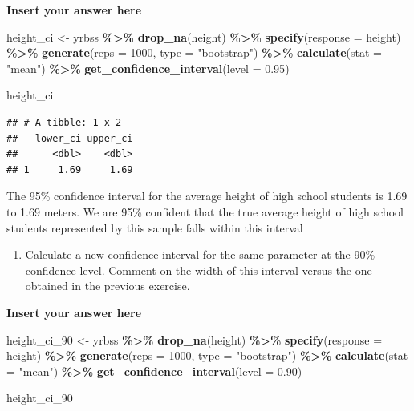 \documentclass[
]{article}
\newenvironment{Shaded}{\begin{snugshade}}{\end{snugshade}}
\newcommand{\AttributeTok}[1]{\textcolor[rgb]{0.13,0.29,0.53}{#1}}
\newcommand{\DecValTok}[1]{\textcolor[rgb]{0.00,0.00,0.81}{#1}}
\newcommand{\FloatTok}[1]{\textcolor[rgb]{0.00,0.00,0.81}{#1}}
\newcommand{\FunctionTok}[1]{\textcolor[rgb]{0.13,0.29,0.53}{\textbf{#1}}}
\newcommand{\NormalTok}[1]{#1}
\newcommand{\OtherTok}[1]{\textcolor[rgb]{0.56,0.35,0.01}{#1}}
\newcommand{\SpecialCharTok}[1]{\textcolor[rgb]{0.81,0.36,0.00}{\textbf{#1}}}
\newcommand{\StringTok}[1]{\textcolor[rgb]{0.31,0.60,0.02}{#1}}
\providecommand{\tightlist}{%
  \setlength{\itemsep}{0pt}\setlength{\parskip}{0pt}}
\begin{document}
\textbf{Insert your answer here}

\begin{Shaded}
\begin{Highlighting}[]
\NormalTok{height\_ci }\OtherTok{\textless{}{-}}\NormalTok{ yrbss }\SpecialCharTok{\%\textgreater{}\%}
  \FunctionTok{drop\_na}\NormalTok{(height) }\SpecialCharTok{\%\textgreater{}\%}
  \FunctionTok{specify}\NormalTok{(}\AttributeTok{response =}\NormalTok{ height) }\SpecialCharTok{\%\textgreater{}\%}
  \FunctionTok{generate}\NormalTok{(}\AttributeTok{reps =} \DecValTok{1000}\NormalTok{, }\AttributeTok{type =} \StringTok{"bootstrap"}\NormalTok{) }\SpecialCharTok{\%\textgreater{}\%}
  \FunctionTok{calculate}\NormalTok{(}\AttributeTok{stat =} \StringTok{"mean"}\NormalTok{) }\SpecialCharTok{\%\textgreater{}\%}
  \FunctionTok{get\_confidence\_interval}\NormalTok{(}\AttributeTok{level =} \FloatTok{0.95}\NormalTok{)}

\NormalTok{height\_ci}
\end{Highlighting}
\end{Shaded}

\begin{verbatim}
## # A tibble: 1 x 2
##   lower_ci upper_ci
##      <dbl>    <dbl>
## 1     1.69     1.69
\end{verbatim}

The 95\% confidence interval for the average height of high school
students is 1.69 to 1.69 meters. We are 95\% confident that the true
average height of high school students represented by this sample falls
within this interval

\begin{enumerate}
\def\labelenumi{\arabic{enumi}.}
\setcounter{enumi}{8}
\tightlist
\item
  Calculate a new confidence interval for the same parameter at the 90\%
  confidence level. Comment on the width of this interval versus the one
  obtained in the previous exercise.
\end{enumerate}

\textbf{Insert your answer here}

\begin{Shaded}
\begin{Highlighting}[]
\NormalTok{height\_ci\_90 }\OtherTok{\textless{}{-}}\NormalTok{ yrbss }\SpecialCharTok{\%\textgreater{}\%}
  \FunctionTok{drop\_na}\NormalTok{(height) }\SpecialCharTok{\%\textgreater{}\%}
  \FunctionTok{specify}\NormalTok{(}\AttributeTok{response =}\NormalTok{ height) }\SpecialCharTok{\%\textgreater{}\%}
  \FunctionTok{generate}\NormalTok{(}\AttributeTok{reps =} \DecValTok{1000}\NormalTok{, }\AttributeTok{type =} \StringTok{"bootstrap"}\NormalTok{) }\SpecialCharTok{\%\textgreater{}\%}
  \FunctionTok{calculate}\NormalTok{(}\AttributeTok{stat =} \StringTok{"mean"}\NormalTok{) }\SpecialCharTok{\%\textgreater{}\%}
  \FunctionTok{get\_confidence\_interval}\NormalTok{(}\AttributeTok{level =} \FloatTok{0.90}\NormalTok{)}

\NormalTok{height\_ci\_90}
\end{Highlighting}
\end{Shaded}
\end{document}
